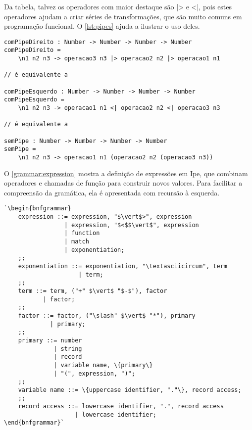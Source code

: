 Da tabela, talvez os operadores com maior destaque são |> e <|, pois estes operadores
ajudam a criar séries de transformações, que são muito comuns em programação funcional.
O \autoref{lst:pipes} ajuda a ilustrar o uso deles.

\begin{lstlisting}[label={lst:pipes},caption={Exemplos de uso dos operadores de pipe}]
comPipeDireito : Number -> Number -> Number -> Number
comPipeDireito =
    \n1 n2 n3 -> operacao3 n3 |> operacao2 n2 |> operacao1 n1

// é equivalente a

comPipeEsquerdo : Number -> Number -> Number -> Number
comPipeEsquerdo =
    \n1 n2 n3 -> operacao1 n1 <| operacao2 n2 <| operacao3 n3

// é equivalente a

semPipe : Number -> Number -> Number -> Number
semPipe =
    \n1 n2 n3 -> operacao1 n1 (operacao2 n2 (operacao3 n3))
\end{lstlisting}

O \autoref{grammar:expression} mostra a definição de expressões em Ipe, que combinam
operadores e chamadas de função para construir novos valores. Para facilitar a
compreensão da gramática, ela é apresentada com recursão à esquerda.

\begin{lstlisting}[label={grammar:expression},caption={Definição de expressões em EBNF},escapechar=`,numbers=none]
`\begin{bnfgrammar}
    expression ::= expression, "$\vert$>", expression
                 | expression, "$<$$\vert$", expression
                 | function
                 | match
                 | exponentiation;
    ;;
    exponentiation ::= exponentiation, "\textasciicircum", term
                     | term;
    ;;
    term ::= term, ("+" $\vert$ "$-$"), factor
           | factor;
    ;;
    factor ::= factor, ("\slash" $\vert$ "*"), primary
             | primary;
    ;;
    primary ::= number
              | string
              | record
              | variable name, \{primary\}
              | "(", expression, ")";
    ;;
    variable name ::= \{uppercase identifier, "."\}, record access;
    ;;
    record access ::= lowercase identifier, ".", record access
                    | lowercase identifier;
\end{bnfgrammar}`
\end{lstlisting}
